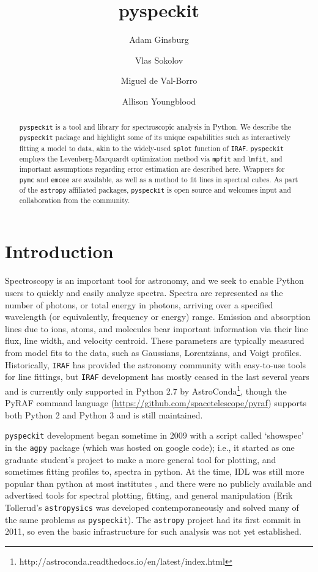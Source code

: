 \documentclass[twocolumn]{aastex62}
\newcommand{\pyspeckit}{\texttt{pyspeckit}\xspace}
\newcommand{\astropy}{\texttt{astropy}\xspace}
\begin{document}
\title{pyspeckit}

\author[0000-0001-6431-9633]{Adam Ginsburg}

\author[]{Vlas Sokolov}
\author[]{Miguel de Val-Borro}
\author[]{Allison Youngblood}



\begin{abstract}
\pyspeckit is a tool and library for spectroscopic analysis in Python. We
describe the \pyspeckit package and highlight some of its unique capabilities
such as interactively fitting a model to data, akin to the widely-used
\texttt{splot} function of \texttt{IRAF}. \pyspeckit employs the
Levenberg-Marquardt optimization method via \texttt{mpfit} and \texttt{lmfit},
and important assumptions regarding error estimation are described here.
Wrappers for \texttt{pymc} and \texttt{emcee} are available, as well as a
method to fit lines in spectral cubes. As part of the \astropy affiliated
packages, \pyspeckit is open source and welcomes input and collaboration from
the community.
\end{abstract}


\section{Introduction}
Spectroscopy is an important tool for astronomy, and we seek to enable Python users
to quickly and easily analyze spectra.  Spectra are represented as
the number of photons, or total energy in photons, arriving over a specified
wavelength (or equivalently, frequency or energy) range. Emission and 
absorption lines due to ions, atoms, and molecules bear important information
via their line flux, line width, and velocity centroid. These parameters are
typically measured from model fits to the data, such as Gaussians, Lorentzians,
and Voigt profiles. Historically, \texttt{IRAF} has provided the astronomy
community with easy-to-use tools for line fittings, but \texttt{IRAF}
development has mostly ceased in the last several years and is currently only
supported in Python 2.7 by
AstroConda\footnote{http://astroconda.readthedocs.io/en/latest/index.html},
though the PyRAF command language
(\url{https://github.com/spacetelescope/pyraf}) supports both Python 2 and
Python 3 and is still maintained.


\pyspeckit development began sometime in 2009 with a script called `showspec'
in the \texttt{agpy} package (which was hosted on google code); i.e., it started as one graduate student's
project to make a more general tool for plotting, and sometimes fitting
profiles to, spectra in python.  At the time, IDL was still more popular than
python at most institutes \citep[][provided the first evidence that
python had overtaken IDL]{Momcheva2015a}, and there were no publicly available
and advertised tools for spectral plotting, fitting, and general manipulation
(Erik Tollerud's \texttt{astropysics} was developed contemporaneously and
solved many of the same problems as \pyspeckit).
The \astropy project had its first commit in 2011, so even the basic
infrastructure for such analysis was not yet established.
\end{document}

